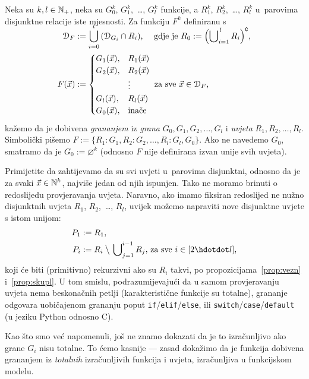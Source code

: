\begin{definicija}[{name=[grananje]}]\label{def:gr}
Neka su $k,l\in{\mathbb N}_+$, neka su $G_0^k$, $G_1^k$,~\ldots, $G_l^k$ funkcije, a $R_1^k$, $R_2^k$,~\ldots, $R_l^k$ u~parovima disjunktne relacije iste mjesnosti. Za funkciju $F^k$ definiranu s
\begin{align}
\SwapAboveDisplaySkip
    \dom{F}&:=\bigcup_{i=0}^l\,(\dom{G_i}\cap R_i)\text{, \quad gdje je }
    R_0:=\Bigl(\bigcup\nolimits_{i=1}^{\,l}R_i\Bigr)\kompl\text,\\
    F(\vec x)&:=\begin{cases}
    G_1(\vec x),&R_1(\vec x)\\
    G_2(\vec x),&R_2(\vec x)\\
    &\vdots\\
    G_l(\vec x),&R_l(\vec x)\\
    G_0(\vec x),&\text{inače}
    \end{cases}\text{ za sve $\vec x\in\dom F$,}
\end{align}
kažemo da je dobivena \emph{grananjem} iz \emph{grana} $G_0,G_1,G_2,\dotsc,G_l$ i \emph{uvjeta} $R_1,R_2,\dotsc,R_l$. Simbolički pišemo $F:=\{R_1\colon G_1,R_2\colon G_2,\dotsc,R_l\colon G_l,G_0\}$. Ako ne navedemo $G_0$, smatramo da je $G_0:=\varnothing^k$ (odnosno $F$ nije definirana izvan unije svih uvjeta).
\end{definicija}

Primijetite da zahtijevamo da su svi uvjeti u~parovima disjunktni, odnosno da je za svaki $\vec x\in{\mathbb N}^k$, najviše jedan od njih ispunjen. Tako ne moramo brinuti o redoslijedu provjeravanja uvjeta. Naravno, ako imamo fiksiran redoslijed ne nužno disjunktnih uvjeta $R_1$, $R_2$,~\ldots, $R_l$, uvijek možemo napraviti nove disjunktne uvjete s istom unijom:
\begin{align}
    P_1&:=R_1\text,\\
    P_i&:=R_i\mathbin{\big\backslash}\,\bigcup\nolimits_{j=1}^{i-1}R_j\text{, za sve $i\in[2\dd l]$,}
\end{align}
koji će biti (primitivno) rekurzivni ako su $R_i$ takvi, po propozicijama~\ref{prop:vezn} i~\ref{prop:skupl}. U tom smislu, podrazumijevajući da u samom provjeravanju uvjeta nema beskonačnih petlji (karakteristične funkcije su totalne), grananje odgovara uobičajenom grananju poput \texttt{if}/\texttt{elif}/\texttt{else}, ili \texttt{switch}/\texttt{case}/\texttt{default} (u jeziku Python odnosno C).

Kao što smo već napomenuli, još ne znamo dokazati da je to izračunljivo ako grane $G_i$ nisu totalne. To ćemo kasnije --- zasad dokažimo da je funkcija dobivena grananjem iz \emph{totalnih} izračunljivih funkcija i uvjeta, izračunljiva u funkcijskom modelu.

